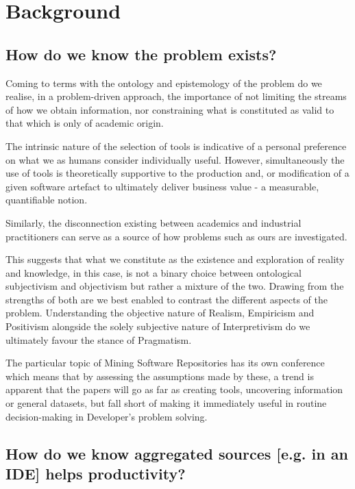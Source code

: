 \chapter{Background}

\section{How do we know the problem exists?}

Coming to terms with the ontology and epistemology of the problem do we realise, in a problem-driven approach, the importance of not limiting the streams of how we obtain information, nor constraining what is constituted as valid to that which is only of academic origin.

The intrinsic nature of the selection of tools is indicative of a personal preference on what we as humans consider individually useful. However, simultaneously the use of tools is theoretically supportive to the production and, or modification of a given software artefact to ultimately deliver business value - a measurable, quantifiable notion.

Similarly, the disconnection existing between academics and industrial practitioners can serve as a source of how problems such as ours are investigated.

This suggests that what we constitute as the existence and exploration of reality and knowledge, in this case, is not a binary choice between ontological subjectivism and objectivism but rather a mixture of the two. Drawing from the strengths of both are we best enabled to contrast the different aspects of the problem. Understanding the objective nature of Realism, Empiricism and Positivism alongside the solely subjective nature of Interpretivism do we ultimately favour the stance of Pragmatism.

The particular topic of Mining Software Repositories has its own conference \parencite{Storey:2019:3341883} which means that by assessing the assumptions made by these, a trend is apparent that the papers will go as far as creating tools, uncovering information or general datasets, but fall short of making it immediately useful in routine decision-making in Developer's problem solving.


\section{How do we know aggregated sources [e.g. in an IDE] helps productivity?}


